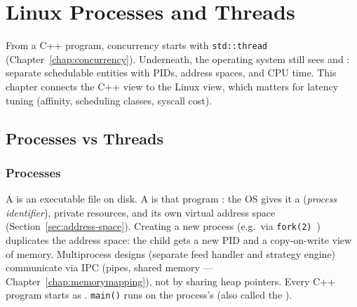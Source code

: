 \chapter{Linux Processes and Threads}
\label{chap:linuxprocesses}

From a C++ program, concurrency starts with \texttt{std::thread} (Chapter~\ref{chap:concurrency}). 
Underneath, the operating system still sees  and : separate 
schedulable entities with PIDs, address spaces, and CPU time. 
This chapter connects the C++ view to the Linux view, which matters for latency tuning 
(affinity, scheduling classes, syscall cost).

\section{Processes vs Threads}
\label{sec:processes-vs-threads}

\subsection{Processes}
\label{subsec:processes}
A  is an executable file on disk. A  is that program 
: the OS gives it a  
(\emph{process identifier}), private resources, and its own virtual address space 
(Section~\ref{sec:address-space}).
\newline
Creating a new process (e.g.\ via \texttt{fork(2)}~\cite{man-fork}) duplicates the address 
space: the child gets a new PID and a copy-on-write view of memory. 
Multiprocess designs (separate feed handler and strategy engine) communicate via IPC 
(pipes, shared memory --- Chapter~\ref{chap:memorymapping}), not by sharing heap pointers.
\newline
Every C++ program starts as . \texttt{main()} runs on the process's 
 (also called the ).

